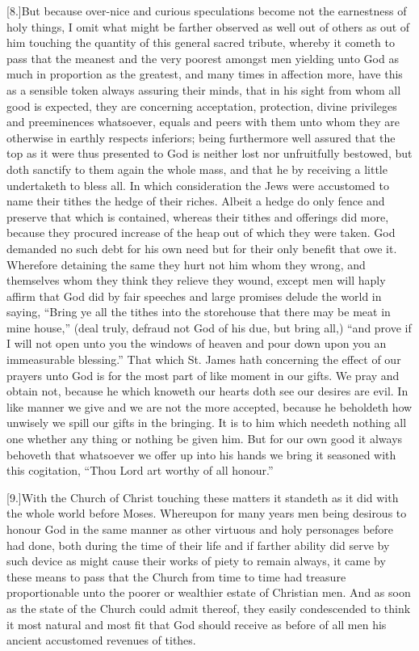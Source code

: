 [8.]But because over-nice and curious speculations become not the earnestness of holy things, I omit what might be farther observed as well out of others as out of him touching the quantity of this general sacred tribute, whereby it cometh to  pass that the meanest and the very poorest amongst men yielding unto God as much in proportion as the greatest, and many times in affection more, have this as a sensible token always assuring their minds, that in his sight from whom all good is expected, they are concerning acceptation, protection, divine privileges and preeminences whatsoever, equals and peers with them unto whom they are otherwise in earthly respects inferiors; being furthermore well assured that the top as it were thus presented to God is neither lost nor unfruitfully bestowed, but doth sanctify to them again the whole mass, and that he by receiving a little undertaketh to bless all. In which consideration the Jews were accustomed to name their tithes the hedge of their riches. Albeit a hedge do only fence and preserve that which is contained, whereas their tithes and offerings did more, because they procured increase of the heap out of which they were taken. God demanded no such debt for his own need but for their only benefit that owe it. Wherefore detaining the same they hurt not him whom they wrong, and themselves whom they think they relieve they wound, except men will haply affirm that God did by fair speeches and large promises delude the world in saying, “Bring ye all the tithes into the storehouse that there may be meat in mine house,” (deal truly, defraud not God of his due, but bring all,) “and prove if I will not open unto you the windows of heaven and pour down upon you an immeasurable blessing.” That which St. James hath concerning the effect of our prayers unto God is for the most part of like moment in our gifts. We pray and obtain not, because he which knoweth our hearts doth see our desires are evil. In like manner we give and we are not the more accepted, because he beholdeth how unwisely we spill our gifts in the bringing. It is to him which needeth nothing all one whether any thing or nothing be given him. But for our own good it always behoveth that whatsoever we offer up into his hands  we bring it seasoned with this cogitation,
 “Thou Lord art worthy of all honour.”

[9.]With the Church of Christ touching these matters it standeth as it did with the whole world before Moses. Whereupon for many years men being desirous to honour God in the same manner as other virtuous and holy personages before had done, both during the time of their life and if farther ability did serve by such device as might cause their works of piety to remain always, it came by these means to pass that the Church from time to time had treasure proportionable unto the poorer or wealthier estate of Christian men. And as soon as the state of the Church could admit thereof, they easily condescended to think it most natural and most fit that God should receive as before of all men his ancient accustomed revenues of tithes.

